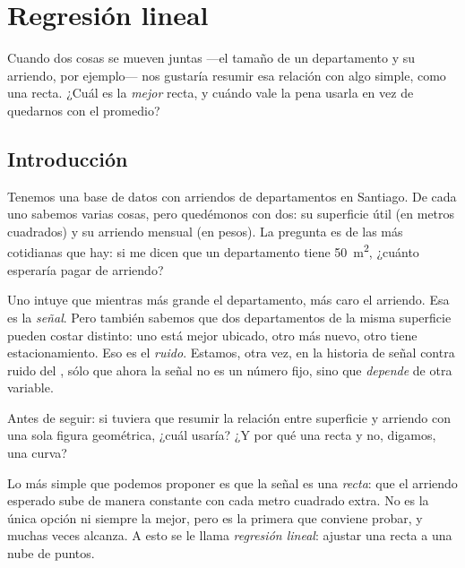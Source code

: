 \chapter{Regresión lineal}


\begin{ideanote}
Cuando dos cosas se mueven juntas —el tamaño de un departamento y su arriendo, por ejemplo— nos gustaría resumir esa relación con algo simple, como una recta. ¿Cuál es la \emph{mejor} recta, y cuándo vale la pena usarla en vez de quedarnos con el promedio?
\end{ideanote}

\section{Introducción}

Tenemos una base de datos con arriendos de departamentos en Santiago. De cada uno sabemos varias cosas, pero quedémonos con dos: su superficie útil (en metros cuadrados) y su arriendo mensual (en pesos). La pregunta es de las más cotidianas que hay: si me dicen que un departamento tiene \qty{50}{\meter\squared}, ¿cuánto esperaría pagar de arriendo?

Uno intuye que mientras más grande el departamento, más caro el arriendo. Esa es la \emph{señal}. Pero también sabemos que dos departamentos de la misma superficie pueden costar distinto: uno está mejor ubicado, otro más nuevo, otro tiene estacionamiento. Eso es el \emph{ruido}. Estamos, otra vez, en la historia de señal contra ruido del , sólo que ahora la señal no es un número fijo, sino que \emph{depende} de otra variable.

\begin{pausa}
Antes de seguir: si tuviera que resumir la relación entre superficie y arriendo con una sola figura geométrica, ¿cuál usaría? ¿Y por qué una recta y no, digamos, una curva?
\end{pausa}

Lo más simple que podemos proponer es que la señal es una \emph{recta}: que el arriendo esperado sube de manera constante con cada metro cuadrado extra. No es la única opción ni siempre la mejor, pero es la primera que conviene probar, y muchas veces alcanza. A esto se le llama \emph{regresión lineal}: ajustar una recta a una nube de puntos.

